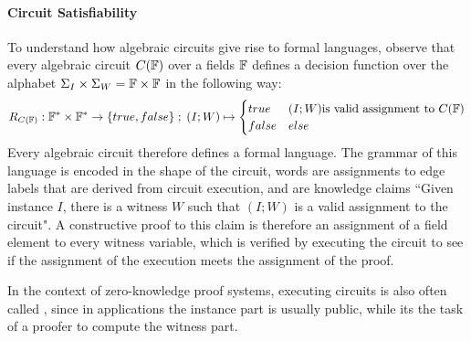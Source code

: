 \paragraph{Circuit Satisfiability} To understand how algebraic circuits give rise to formal languages, observe that every algebraic circuit $C(\mathbb{F})$ over a fields $\mathbb{F}$ defines a decision function over the alphabet $\Sigma_I \times \Sigma_W = \mathbb{F} \times \mathbb{F}$ in the following way:
\begin{equation}
R_{C(\mathbb{F})} : \mathbb{F}^* \times \mathbb{F}^* \to \{true, false\}\;;\;
(I;W) \mapsto
\begin{cases}
true & (I;W) \text{is valid assignment to } C(\mathbb{F})\\
false & else
\end{cases}
\end{equation}
Every algebraic circuit therefore defines a formal language. The grammar of this language is encoded in the shape of the circuit, words are assignments to edge labels that are derived from circuit execution, and  are knowledge claims ``Given instance $I$, there is a witness $W$ such that $(I;W)$ is a valid assignment to the circuit". A constructive proof to this claim is therefore an assignment of a field element to every witness variable, which is verified by executing the circuit to see if the assignment of the execution meets the assignment of the proof. 

In the context of zero-knowledge proof systems, executing circuits is also often called , since in applications the instance part is usually public, while its the task of a proofer to compute the witness part.

